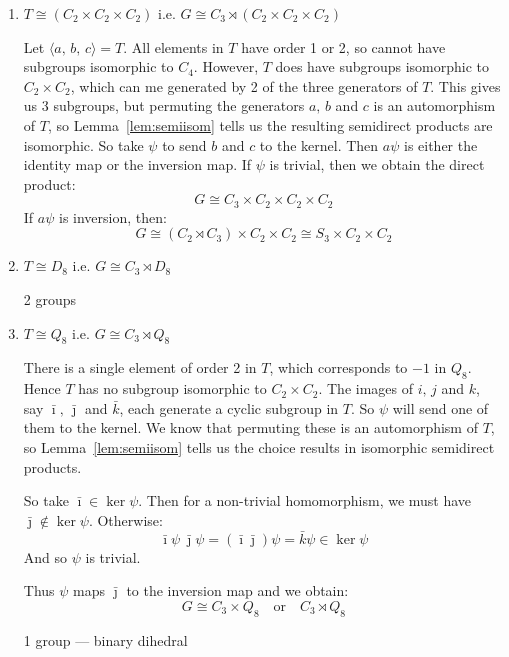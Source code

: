 \begin{enumerate}
    \item \(T \cong (C_2 \times C_2 \times C_2)\) i.e. \(G \cong C_3 \rtimes (C_2 \times C_2 \times C_2)\)

        Let \(\langle a,\,b,\,c \rangle = T\).
        All elements in \(T\) have order 1 or 2, so cannot have subgroups isomorphic to \(C_4\).
        However, \(T\) does have subgroups isomorphic to \(C_2 \times C_2\), which can me generated by 2 of the three
        generators of \(T\).
        This gives us 3 subgroups, but permuting the generators \(a,\,b\) and \(c\) is an automorphism of \(T\), so
        Lemma~\ref{lem:semiisom} tells us the resulting semidirect products are isomorphic.
        So take \(\psi\) to send \(b\) and \(c\) to the kernel.
        Then \(a\psi\) is either the identity map or the inversion map.
        If \(\psi\) is trivial, then we obtain the direct product:
        \[G \cong C_3 \times C_2 \times C_2 \times C_2\]
        If \(a\psi\) is inversion, then:
        \[ G \cong (C_2 \rtimes C_3) \times C_2 \times C_2 \cong S_3 \times C_2 \times C_2\]


    \item \(T \cong D_8\) i.e. \(G \cong C_3 \rtimes D_8\)

        2 groups
    \item \(T \cong Q_8\) i.e. \(G \cong C_3 \rtimes Q_8\)

        There is a single element of order 2 in \(T\), which corresponds to \(-1\) in \(Q_8\).
        Hence \(T\) has no subgroup isomorphic to \(C_2 \times C_2\).
        The images of \(i,\,j\) and \(k\), say \(\bar{\imath},\,\bar{\jmath}\) and \(\bar{k}\), each generate a cyclic subgroup in
        \(T\).
        So \(\psi\) will send one of them to the kernel.
        We know that permuting these is an automorphism of \(T\), so Lemma~\ref{lem:semiisom} tells us the choice
        results in isomorphic semidirect products.

        So take \(\bar{\imath} \in \ker{\psi}\).
        Then for a non-trivial homomorphism, we must have \(\bar{\jmath} \notin \ker{\psi}\).
        Otherwise:
        \[\bar{\imath}\psi\ \bar{\jmath}\psi = (\bar{\imath}\bar{\jmath})\psi = \bar{k}\psi \in \ker{\psi}\]
        And so \(\psi\) is trivial.

        Thus \(\psi\) maps \(\bar{\jmath}\) to the inversion map and we obtain:
        \[G \cong C_3 \times Q_8 \quad \text{or} \quad C_3 \rtimes Q_8\]

        1 group --- binary dihedral
\end{enumerate}

